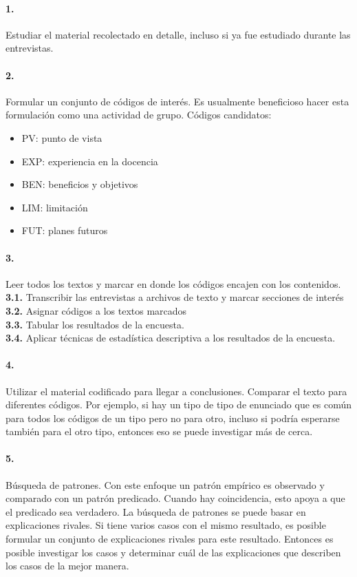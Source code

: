 \paragraph{1.} Estudiar el material recolectado en detalle, incluso si ya fue estudiado durante las entrevistas. 

\paragraph{2.} Formular un conjunto de códigos de interés. Es usualmente beneficioso hacer esta formulación como una actividad de grupo. Códigos candidatos:
\begin{center}
\begin{itemize}
    \item PV: punto de vista
    \item EXP: experiencia en la docencia
    \item BEN: beneficios y objetivos
    \item LIM: limitación
    \item FUT: planes futuros
\end{itemize}

\end{center}


\paragraph{3.} Leer todos los textos y marcar en donde los códigos encajen con los contenidos.\\
\textbf{3.1.} Transcribir las entrevistas a archivos de texto y marcar secciones de interés\\
\textbf{3.2.} Asignar códigos a los textos marcados \\
\textbf{3.3.} Tabular los resultados de la encuesta. \\
\textbf{3.4.} Aplicar técnicas de estadística descriptiva a los resultados de la encuesta.

\paragraph{4.} Utilizar el material codificado para llegar a conclusiones. Comparar el texto para diferentes códigos. Por ejemplo, si hay un tipo de tipo de enunciado que es común para todos los códigos de un tipo pero no para otro, incluso si podría esperarse también para el otro tipo, entonces eso se puede investigar más de cerca.

\paragraph{5.} Búsqueda de patrones. Con este enfoque un patrón empírico es observado y comparado con un patrón predicado. Cuando hay coincidencia, esto apoya a que el predicado sea verdadero. La búsqueda de patrones se puede basar en explicaciones rivales. Si tiene varios casos con el mismo resultado, es posible formular un conjunto de explicaciones rivales para este resultado. Entonces es posible investigar los casos y determinar cuál de las explicaciones que describen los casos de la mejor manera.

